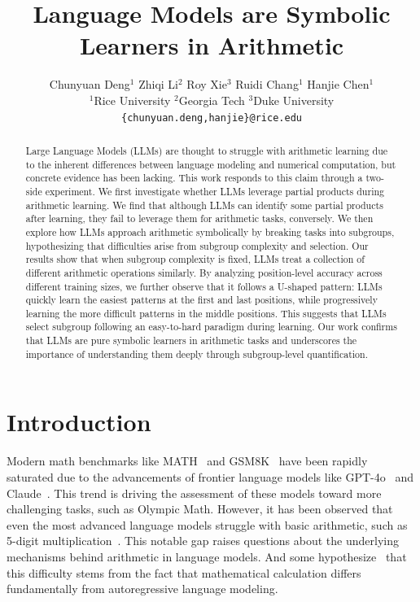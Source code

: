 \documentclass[11pt]{article}
\title{Language Models are Symbolic Learners in Arithmetic}
\author{Chunyuan Deng$^1$ \quad Zhiqi Li$^{2}$ \quad Roy Xie$^3$ \quad Ruidi Chang$^1$ \quad Hanjie Chen$^{1}$ \\
$^1$Rice University \quad $^2$Georgia Tech \quad $^3$Duke University\\
\texttt{\{chunyuan.deng,hanjie\}@rice.edu} \\
}
\begin{document}
\maketitle
\begin{abstract}
Large Language Models (LLMs) are thought to struggle with arithmetic learning due to the inherent differences between language modeling and numerical computation, but concrete evidence has been lacking. This work responds to this claim through a two-side experiment. We first investigate whether LLMs leverage partial products during arithmetic learning. We find that although LLMs can identify some partial products after learning, they fail to leverage them for arithmetic tasks, conversely. We then explore how LLMs approach arithmetic symbolically by breaking tasks into subgroups, hypothesizing that difficulties arise from subgroup complexity and selection. Our results show that when subgroup complexity is fixed, LLMs treat a collection of different arithmetic operations similarly. By analyzing position-level accuracy across different training sizes, we further observe that it follows a U-shaped pattern: LLMs quickly learn the easiest patterns at the first and last positions, while progressively learning the more difficult patterns in the middle positions. This suggests that LLMs select subgroup following an easy-to-hard paradigm during learning. Our work confirms that LLMs are pure symbolic learners in arithmetic tasks and underscores the importance of understanding them deeply through subgroup-level quantification. 
\end{abstract}
\section{Introduction}
Modern math benchmarks like MATH~\citep{hendrycks2021measuringmathematicalproblemsolving} and GSM8K~\citep{cobbe2021trainingverifierssolvemath} have been rapidly saturated due to the advancements of frontier language models like GPT-4o~\citep{openai2024gpt4technicalreport} and Claude~\citep{claude}. 
This trend is driving the assessment of these models toward more challenging tasks, such as Olympic Math. However, it has been observed that even the most advanced language models struggle with basic arithmetic, such as 5-digit multiplication~\citep{yang2023gptsolvemathematicalproblems}. This notable gap raises questions about the underlying mechanisms behind arithmetic in language models. And some hypothesize~\citep{boguraev2024modelsembracecommunicativenature} that this difficulty stems from the fact that mathematical calculation differs fundamentally from autoregressive language modeling.
\end{document}
